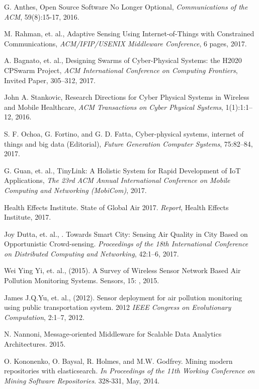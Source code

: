 \documentclass[11pt]{article}
\begin{document}
\begin{thebibliography}{abrv}



 G. Anthes, Open Source Software No Longer Optional, {\it Communications of the ACM}, 59(8):15-17, 2016.

 M. Rahman, et. al., Adaptive Sensing Using Internet-of-Things with Constrained Communications, {\it ACM/IFIP/USENIX Middleware Conference}, 6 pages, 2017.

 A. Bagnato, et. al., Designing Swarms of Cyber-Physical Systems: the H2020 CPSwarm Project, 
{\it ACM International Conference on Computing Frontiers}, Invited Paper, 305--312, 2017.

 John A. Stankovic, Research Directions for Cyber Physical Systems in Wireless and Mobile Healthcare,
{\it ACM Transactions on Cyber Physical Systems}, 1(1):1:1--12, 2016.

 S. F. Ochoa, G. Fortino, and G. D. Fatta, Cyber-physical systems, internet of things and big data (Editorial), {\it Future Generation Computer Systems}, 75:82--84, 2017.

 G. Guan, et. al., TinyLink: A Holistic System for Rapid Development of IoT Applications,
{\it The 23rd ACM Annual International Conference on Mobile Computing and Networking (MobiCom)}, 2017.

 Health Effects Institute. State of Global Air 2017. {\it Report}, Health Effects Institute, 2017.

 Joy Dutta, et. al., . Towards Smart City: Sensing Air Quality in City Based on Opportunistic Crowd-sensing. {\it Proceedings of the 18th International Conference on Distributed Computing and Networking}, 42:1--6, 2017. 

 Wei Ying Yi, et. al., (2015). A Survey of Wireless Sensor Network Based Air Pollution Monitoring Systems. Sensors,  15: , 2015. 

 James J.Q.Yu, et. al., (2012). Sensor deployment for air pollution monitoring using public transportation system. 2012 {\it IEEE Congress on Evolutionary Computation}, 2:1--7, 2012.  

 N. Nannoni,  Message-oriented Middleware for Scalable Data Analytics Architectures.  2015.

O. Kononenko, O. Baysal, R. Holmes, and M.W. Godfrey. Mining modern repositories with elasticsearch. \textit{In Proceedings of the 11th Working Conference on Mining Software Repositories}. 328-331, May, 2014.


\end{thebibliography}
\end{document}
